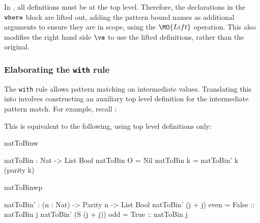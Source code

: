 
In \TT{}, all definitions must be at the top level. Therefore, the declarations 
in the $\mathtt{where}$ block are lifted out, adding the pattern bound names as additional arguments
to ensure they are in scope, using the $\MO{Lift}$ operation. This also modifies
the right hand side $\ve$ to use the lifted definitions, rather than the original.

\subsubsection{Elaborating the \texttt{with} rule}

The \texttt{with} rule allows  pattern matching on intermediate values.
Translating this into \TT{} involves constructing an auxiliary top level
definition for 
the intermediate pattern match. For example, recall :


\noindent
This is equivalent to the following, using top level definitions only:

\begin{SaveVerbatim}{natToBinw}

natToBin : Nat -> List Bool
natToBin O = Nil
natToBin k = natToBin' k (parity k)

\end{SaveVerbatim}
\begin{SaveVerbatim}{natToBinwp}

natToBin' : (n : Nat) -> Parity n -> List Bool
natToBin' (j + j)     even = False :: natToBin j
natToBin' (S (j + j)) odd  = True  :: natToBin j

\end{SaveVerbatim}


